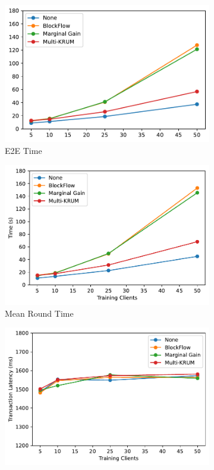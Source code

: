 \begin{figure}[!hb]
    \centering
    \begin{subfigure}[b]{0.49\textwidth}
        \centering
        \includegraphics[width=\textwidth]{graphics/clients/e2e.pdf}
        \caption{E2E Time}
    \end{subfigure}
    \hfill
    \begin{subfigure}[b]{0.49\textwidth}
        \centering
        \includegraphics[width=\textwidth]{graphics/clients/round.pdf}
        \caption{Mean Round Time}
    \end{subfigure}
    \hfill
    \begin{subfigure}[b]{0.49\textwidth}
        \centering
        \includegraphics[width=\textwidth]{graphics/clients/tx_latency.pdf}

\end{subfigure}
\end{figure}
